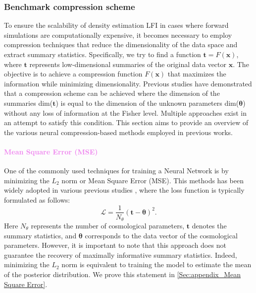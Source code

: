 \documentclass{aa}
\begin{document}
\subsubsection{Benchmark compression scheme}
To ensure the scalability of density estimation LFI in cases where forward simulations are computationally expensive, it becomes necessary to employ compression techniques that reduce the dimensionality of the data space and extract summary statistics. 
Specifically, we try to find a function $\bm{t}=F(\bm{x})$, where $\bm{t}$ represents low-dimensional summaries of the original data vector $\bm{x}$. The objective is to achieve a compression function $F(\bm{x})$ that maximizes the information while minimizing dimensionality. Previous studies \citep{heavens2000massive} have demonstrated that a compression scheme can be achieved where the dimension of the summaries dim($\bm{t}$) is equal to the dimension of the unknown parameters dim($\bm{\theta}$) without any loss of information at the Fisher level. Multiple approaches exist in an attempt to satisfy this condition. This section aims to provide an overview of the various neural compression-based methods employed in previous works.
\paragraph{\textcolor{violet}{Mean Square Error (MSE)}}
One of the commonly used techniques for training a Neural Network is by minimizing the $L_2$ norm or Mean Square Error (MSE).
This methods has been widely adopted in various previous studies  \citep{ribli2018improved, lu2022simultaneously, lu2023cosmological}, where the loss function is typically formulated as follows:
\begin{equation}
   \mathcal{L}=\frac{1}{N_{\theta}}(\bm{t}-\bm{\theta})^2.
\end{equation}
Here $N_{\theta}$ represents the number of cosmological parameters, $\bm{t}$ denotes the summary statistics, and $\bm{\theta}$ corresponds to the data vector of the cosmological parameters. 
However, it is important to note that this approach does not guarantee the recovery of maximally informative summary statistics. Indeed, minimizing the $L_{2}$ norm is equivalent to training the model to estimate the mean of the posterior distribution.  We prove this statement in \autoref{Sec:appendix_Mean Square Error}.
\end{document}
